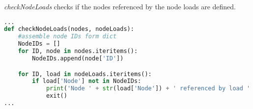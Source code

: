 \textit{checkNodeLoads} checks if the nodes referenced by the node loads are defined.

\begin{inconsolata}
\begin{minipage}{\linewidth}
\begin{lstlisting}[language=python]
...
def checkNodeLoads(nodes, nodeLoads):
    #assemble node IDs form dict
    NodeIDs = []
    for ID, node in nodes.iteritems():
        NodeIDs.append(node['ID'])

    for ID, load in nodeLoads.iteritems():
        if load['Node'] not in NodeIDs:
            print('Node ' + str(load['Node']) + ' referenced by load ' + str(ID) + ' but not defined.')
            exit()
...
\end{lstlisting}
\end{minipage}
\end{inconsolata}

